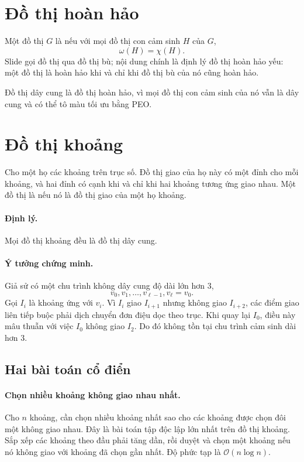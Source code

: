 \documentclass[11pt]{article}
\newcommand{\Oh}{\mathcal{O}}
\begin{document}
\section{Đồ thị hoàn hảo}

Một đồ thị \(G\) là  nếu với mọi đồ thị con cảm sinh \(H\) của
\(G\),
\[
  \omega(H)=\chi(H).
\]
Slide gọi đồ thị  qua đồ thị bù; nội dung chính là định lý
đồ thị hoàn hảo yếu: một đồ thị là hoàn hảo khi và chỉ khi đồ thị bù của nó
cũng hoàn hảo.

Đồ thị dây cung là đồ thị hoàn hảo, vì mọi đồ thị con cảm sinh của nó vẫn là
dây cung và có thể tô màu tối ưu bằng PEO.

\section{Đồ thị khoảng}

Cho một họ các khoảng trên trục số. Đồ thị giao của họ này có một đỉnh cho
mỗi khoảng, và hai đỉnh có cạnh khi và chỉ khi hai khoảng tương ứng giao
nhau. Một đồ thị là  nếu nó là đồ thị giao của một họ
khoảng.

\paragraph{Định lý.}
Mọi đồ thị khoảng đều là đồ thị dây cung.

\paragraph{Ý tưởng chứng minh.}
Giả sử có một chu trình không dây cung độ dài lớn hơn \(3\),
\[
  v_0,v_1,\ldots,v_{\ell-1},v_\ell=v_0.
\]
Gọi \(I_i\) là khoảng ứng với \(v_i\). Vì \(I_i\) giao \(I_{i+1}\) nhưng
không giao \(I_{i+2}\), các điểm giao liên tiếp buộc phải dịch chuyển đơn
điệu dọc theo trục. Khi quay lại \(I_0\), điều này mâu thuẫn với việc
\(I_0\) không giao \(I_2\). Do đó không tồn tại chu trình cảm sinh dài hơn
\(3\).

\subsection{Hai bài toán cổ điển}

\paragraph{Chọn nhiều khoảng không giao nhau nhất.}
Cho \(n\) khoảng, cần chọn nhiều khoảng nhất sao cho các khoảng được chọn đôi
một không giao nhau. Đây là bài toán tập độc lập lớn nhất trên đồ thị khoảng.
Sắp xếp các khoảng theo đầu phải tăng dần, rồi duyệt và chọn một khoảng nếu
nó không giao với khoảng đã chọn gần nhất. Độ phức tạp là
\(\Oh(n\log n)\).
\end{document}
